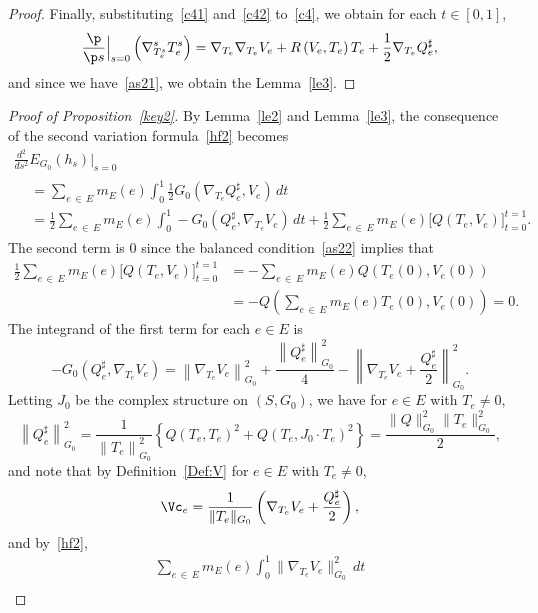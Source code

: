 \begin{proof}
Finally, substituting~\eqref{c41} and~\eqref{c42} to~\eqref{c4}, we obtain for each $t \in [0, 1]$,
\[
\frac{\p}{\p s}\Big|_{s=0}\left(\nabla^s_{T_e^s}T_e^s\right)=\nabla_{T_e}\nabla_{T_e}V_e+R\left(V_e, T_e\right)T_e+\frac{1}{2}\nabla_{T_e}Q_e^{\sharp},
\]
and since we have~\eqref{as21}, we obtain the Lemma~\ref{le3}.
\end{proof}



\begin{proof}[{Proof of Proposition~\ref{key2}}]
By Lemma~\ref{le2} and Lemma~\ref{le3}, the consequence of the second variation formula~\eqref{hf2} becomes
\begin{multline*}
\frac{d^2}{d s^2} E_{G_0}(h_{s})\Big|_{s=0}\\
\begin{aligned}
&=\sum_{e\,\in\,E}m_E(e)\int_0^1 \frac{1}{2}G_0\left(\nabla_{T_e}Q_{e}^{\sharp},V_e\right) \,dt\\
&= \frac{1}{2}\sum_{e\,\in\,E}m_E(e)\int_0^1-G_0\left(Q_e^{\sharp},\nabla_{T_e}V_e\right)\,dt+\frac{1}{2}\sum_{e\,\in\,E}m_E(e)\Big[Q\left(T_e,V_e\right)\Big]_{t=0}^{t=1}.
\end{aligned}
\end{multline*}
The second term is $0$ since the balanced condition~\eqref{as22} implies that
\begin{align*}
\frac{1}{2}\sum_{e\,\in\,E}m_E(e)\Big[Q\left(T_e,V_e\right)\Big]_{t=0}^{t=1} &=-\sum_{e\,\in\,E}m_E(e)Q\left({T_e}(0), V_e(0)\right)\\
&=-Q\left(\sum_{e\,\in\,E}m_E(e)T_e(0), V_e(0)\right)=0.
\end{align*}
The integrand of the first term for each $e \in E$ is
\begin{equation}\label{svf3}
-G_0\left(Q_e^{\sharp}, \nabla_{T_e}V_e\right) =\left\|\nabla_{T_e}V_e\right\|_{G_0}^2+\frac{\left\|Q_e^{\sharp}\right\|_{G_0}^2}{4}-\left\|\nabla_{T_e}V_e+\frac{Q_e^{\sharp}}{2}\right\|^2_{G_0}.
\end{equation}
Letting $J_0$ be the complex structure on $(S, G_0)$, we have for $e \in E$ with $T_e \neq 0$,
\[
\left\|Q_e^{\sharp}\right\|_{G_0}^2=\frac{1}{{\left\|T_e\right\|_{G_0}^2}}\left\{Q \left(T_e,T_e\right)^2+Q\left(T_e, J_0 \cdot T_e\right)^2\right\} =\frac{\|Q\|_{G_0}^2\|T_e\|_{G_0}^2}{2},
\]
and note that by Definition~\ref{Def:V} for $e \in E$ with $T_e \neq 0$,
\[
\Vc_e=\frac{1}{\|T_e\|_{G_0}}\left(\nabla_{T_e}V_e+\frac{Q_e^{\sharp}}{2}\right),
\]
and by~\eqref{hf2},
\begin{multline*}
\sum_{e\,\in\,E}m_E(e)\int_0^1\|\nabla_{T_e}V_e\|_{G_0}^2\, dt \\

\end{multline*}
\end{proof}
